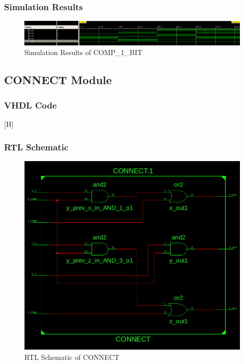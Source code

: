 \documentclass[table ]{article}
\begin{document}
\subsubsection*{Simulation Results}

\begin{figure}[H]
    \centering
    \includegraphics[width=\textwidth]{img/COMP_1_BIT_SIM.png}
    \caption{Simulation Results of COMP\_1\_BIT}
\end{figure}



\subsection*{CONNECT Module}

\subsubsection*{VHDL Code}

\begin{center}[H] %
    \lstset{
  caption= CONNECT.vhd, 
  basicstyle=\footnotesize, frame=tb,
  xleftmargin=.2\textwidth, xrightmargin=.2\textwidth
}
    
\end{center}

\subsubsection*{RTL Schematic}

\begin{figure}[H]
    \centering
    \includegraphics[width=.6\textwidth]{img/connect_rtl.png}
    \caption{RTL Schematic of CONNECT}
\end{figure}
\end{document}
